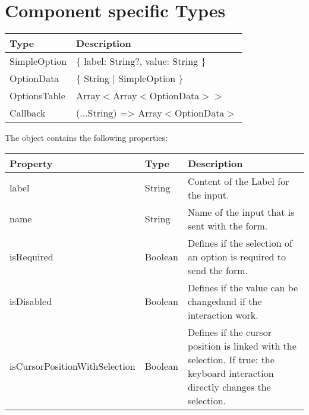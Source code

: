 \section*{Component specific Types}

\begin{table}[!htb] 
    \label{api:selectComponentTypes}
    \footnotesize
    \setlength\extrarowheight{4pt}
    \begin{tabular}{ p{5cm} p{8cm}}
        \toprule[1.2pt]
        \textbf{Type}    & \textbf{Description} \\
        \midrule    
        SimpleOption & \{ label: String?, value: String \}    \\
        OptionData   & \{ String | SimpleOption \}        \\
        OptionsTable & Array$<$Array$<$OptionData$>>$       \\
        Callback     & (...String) => Array$<$OptionData$>$ \\
        \bottomrule[1.2pt]
    \end{tabular}
\end{table}

\vspace*{12pt}
The  object contains the following properties: 

\begin{table}[!htb] 
    \label{api:selectComponentSelectAttributes}
    \footnotesize
    \setlength\extrarowheight{4pt}
    \begin{tabular}{ p{4cm} p{3cm} p{6cm} }
        \toprule[1.2pt]
        \textbf{Property}             & \textbf{Type} & \textbf{Description} \\
        \midrule
        label                         & String        & Content of the Label for the input. \\
        name                          & String        & Name of the input that is sent with the form. \\
        isRequired                    & Boolean       & Defines if the selection of an option is required to send the form. \\
        isDisabled                    & Boolean       & Defines if the value can be changedand if the interaction work. \\
        isCursorPositionWithSelection & Boolean       & Defines if the cursor position is linked with the selection. 
                                                        If true: the keyboard interaction directly changes the selection. \\
        \bottomrule[1.2pt]
    \end{tabular}
\end{table}


